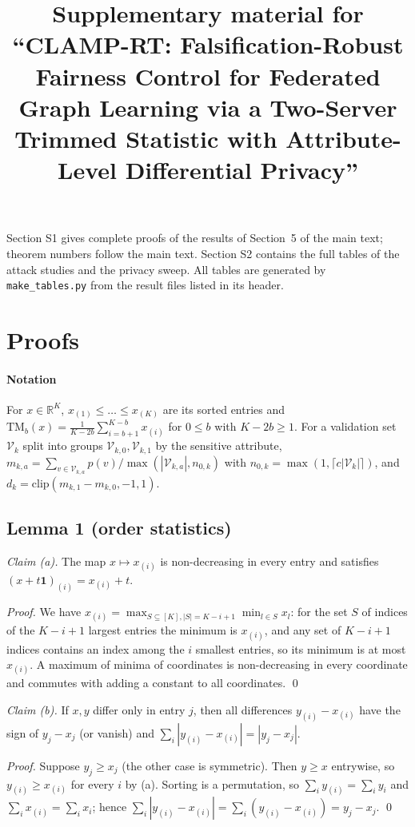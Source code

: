 \documentclass[11pt]{article}
\title{Supplementary material for\\``CLAMP-RT: Falsification-Robust Fairness Control for Federated Graph Learning via a Two-Server Trimmed Statistic with Attribute-Level Differential Privacy''}
\author{}
\date{}
\theoremstyle{plain}
\theoremstyle{definition}
\newcommand{\R}{\mathbb{R}}
\newcommand{\TM}{\mathrm{TM}_b}
\begin{document}
\maketitle

\noindent Section S1 gives complete proofs of the results of Section~5 of the main text; theorem numbers follow the main text. Section S2 contains the full tables of the attack studies and the privacy sweep. All tables are generated by \texttt{make\_tables.py} from the result files listed in its header.

\section{Proofs}

\paragraph{Notation}
For $x\in\R^K$, $x_{(1)}\le\dots\le x_{(K)}$ are its sorted entries and $\TM(x)=\frac{1}{K-2b}\sum_{i=b+1}^{K-b}x_{(i)}$ for $0\le b$ with $K-2b\ge1$. For a validation set $\mathcal{V}_k$ split into groups $\mathcal{V}_{k,0},\mathcal{V}_{k,1}$ by the sensitive attribute, $m_{k,a}=\sum_{v\in\mathcal{V}_{k,a}}p(v)/\max(|\mathcal{V}_{k,a}|,n_{0,k})$ with $n_{0,k}=\max(1,\lceil c|\mathcal{V}_k|\rceil)$, and $d_k=\mathrm{clip}(m_{k,1}-m_{k,0},-1,1)$.

\subsection*{Lemma 1 (order statistics)}
\emph{Claim (a).} The map $x\mapsto x_{(i)}$ is non-decreasing in every entry and satisfies $(x+t\mathbf{1})_{(i)}=x_{(i)}+t$.

\emph{Proof.} We have $x_{(i)}=\max_{S\subseteq[K],|S|=K-i+1}\min_{l\in S}x_l$: for the set $S$ of indices of the $K-i+1$ largest entries the minimum is $x_{(i)}$, and any set of $K-i+1$ indices contains an index among the $i$ smallest entries, so its minimum is at most $x_{(i)}$. A maximum of minima of coordinates is non-decreasing in every coordinate and commutes with adding a constant to all coordinates. \qed

\emph{Claim (b).} If $x,y$ differ only in entry $j$, then all differences $y_{(i)}-x_{(i)}$ have the sign of $y_j-x_j$ (or vanish) and $\sum_i|y_{(i)}-x_{(i)}|=|y_j-x_j|$.

\emph{Proof.} Suppose $y_j\ge x_j$ (the other case is symmetric). Then $y\ge x$ entrywise, so $y_{(i)}\ge x_{(i)}$ for every $i$ by (a). Sorting is a permutation, so $\sum_i y_{(i)}=\sum_i y_i$ and $\sum_i x_{(i)}=\sum_i x_i$; hence $\sum_i|y_{(i)}-x_{(i)}|=\sum_i(y_{(i)}-x_{(i)})=y_j-x_j$. \qed
\end{document}
